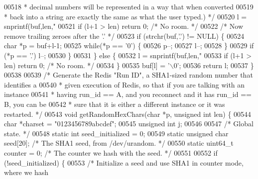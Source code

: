 \begin{DoxyCode}
{00518 \textcolor{comment}{         * decimal numbers will be represented in a way that when converted}
00519 \textcolor{comment}{         * back into a string are exactly the same as what the user typed.) */}
00520         l = snprintf(buf,len,\textcolor{stringliteral}{"%
00521         \textcolor{keywordflow}{if} (l+1 > len) \textcolor{keywordflow}{return} 0; \textcolor{comment}{/* No room. */}
00522         \textcolor{comment}{/* Now remove trailing zeroes after the '.' */}
00523         \textcolor{keywordflow}{if} (strchr(buf,\textcolor{stringliteral}{'.'}) != NULL) \{
00524             \textcolor{keywordtype}{char} *p = buf+l-1;
00525             \textcolor{keywordflow}{while}(*p == \textcolor{stringliteral}{'0'}) \{
00526                 p--;
00527                 l--;
00528             \}
00529             \textcolor{keywordflow}{if} (*p == \textcolor{stringliteral}{'.'}) l--;
00530         \}
00531     \} \textcolor{keywordflow}{else} \{
00532         l = snprintf(buf,len,\textcolor{stringliteral}{"%
00533         \textcolor{keywordflow}{if} (l+1 > len) \textcolor{keywordflow}{return} 0; \textcolor{comment}{/* No room. */}
00534     \}
00535     buf[l] = \textcolor{stringliteral}{'\(\backslash\)0'};
00536     \textcolor{keywordflow}{return} l;
00537 \}
00538 
00539 \textcolor{comment}{/* Generate the Redis "Run ID", a SHA1-sized random number that identifies a}
00540 \textcolor{comment}{ * given execution of Redis, so that if you are talking with an instance}
00541 \textcolor{comment}{ * having run\_id == A, and you reconnect and it has run\_id == B, you can be}
00542 \textcolor{comment}{ * sure that it is either a different instance or it was restarted. */}
00543 \textcolor{keywordtype}{void} getRandomHexChars(\textcolor{keywordtype}{char} *p, \textcolor{keywordtype}{unsigned} \textcolor{keywordtype}{int} len) \{
00544     \textcolor{keywordtype}{char} *charset = \textcolor{stringliteral}{"0123456789abcdef"};
00545     \textcolor{keywordtype}{unsigned} \textcolor{keywordtype}{int} j;
00546 
00547     \textcolor{comment}{/* Global state. */}
00548     \textcolor{keyword}{static} \textcolor{keywordtype}{int} seed\_initialized = 0;
00549     \textcolor{keyword}{static} \textcolor{keywordtype}{unsigned} \textcolor{keywordtype}{char} seed[20]; \textcolor{comment}{/* The SHA1 seed, from /dev/urandom. */}
00550     \textcolor{keyword}{static} uint64\_t counter = 0; \textcolor{comment}{/* The counter we hash with the seed. */}
00551 
00552     \textcolor{keywordflow}{if} (!seed\_initialized) \{
00553         \textcolor{comment}{/* Initialize a seed and use SHA1 in counter mode, where we hash}
}}}
\end{DoxyCode}
